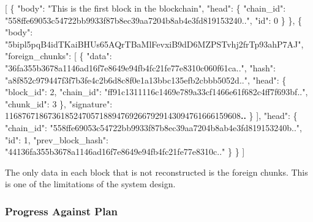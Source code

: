\documentclass[]{article}
\newenvironment{Shaded}{}{}
\newcommand{\DataTypeTok}[1]{\textcolor[rgb]{0.56,0.13,0.00}{#1}}
\newcommand{\DecValTok}[1]{\textcolor[rgb]{0.25,0.63,0.44}{#1}}
\newcommand{\ErrorTok}[1]{\textcolor[rgb]{1.00,0.00,0.00}{\textbf{#1}}}
\newcommand{\FunctionTok}[1]{\textcolor[rgb]{0.02,0.16,0.49}{#1}}
\newcommand{\OtherTok}[1]{\textcolor[rgb]{0.00,0.44,0.13}{#1}}
\newcommand{\StringTok}[1]{\textcolor[rgb]{0.25,0.44,0.63}{#1}}
\begin{document}
\begin{Shaded}
\begin{Highlighting}[]
\OtherTok{[}
    \FunctionTok{\{}
        \DataTypeTok{"body"}\FunctionTok{:} \StringTok{"This is the first block in the blockchain"}\FunctionTok{,}
        \DataTypeTok{"head"}\FunctionTok{:} \FunctionTok{\{}
            \DataTypeTok{"chain_id"}\FunctionTok{:} \StringTok{"558ffe69053c54722bb9933f87b8ec39aa7204b8ab4e3fd819153240.."}\FunctionTok{,}
            \DataTypeTok{"id"}\FunctionTok{:} \DecValTok{0}
        \FunctionTok{\}}
    \FunctionTok{\}}\OtherTok{,}
    \FunctionTok{\{}
        \DataTypeTok{"body"}\FunctionTok{:} \StringTok{"5bipl5pqB4idTKaiBHUs65AQrTBaMlFevxiB9dD6MZPSTvhj2frTp93ahP7AJ"}\FunctionTok{,}
        \DataTypeTok{"foreign_chunks"}\FunctionTok{:} \OtherTok{[}
            \FunctionTok{\{}
                \DataTypeTok{"data"}\FunctionTok{:} \StringTok{"36fa355b3678a1146ad16f7e8649e94fb4fc21fe77e8310c060f61ca.."}\FunctionTok{,}
                \DataTypeTok{"hash"}\FunctionTok{:} \StringTok{"a8f852c979447f3f7b3fe4c2b6d8c8f0e1a13bbc135efb2cbbb5052d.."}\FunctionTok{,}
                \DataTypeTok{"head"}\FunctionTok{:} \FunctionTok{\{}
                    \DataTypeTok{"block_id"}\FunctionTok{:} \DecValTok{2}\FunctionTok{,}
                    \DataTypeTok{"chain_id"}\FunctionTok{:} \StringTok{"ff91c1311116c1469e789a33cf1466e61f682c4ff7f693bf.."}\FunctionTok{,}
                    \DataTypeTok{"chunk_id"}\FunctionTok{:} \DecValTok{3}
                \FunctionTok{\},}
                \DataTypeTok{"signature"}\FunctionTok{:} \DecValTok{1168767186736185247057188947692667929143094761666159608}\ErrorTok{..}
            \FunctionTok{\}}
        \OtherTok{]}\FunctionTok{,}
        \DataTypeTok{"head"}\FunctionTok{:} \FunctionTok{\{}
            \DataTypeTok{"chain_id"}\FunctionTok{:} \StringTok{"558ffe69053c54722bb9933f87b8ec39aa7204b8ab4e3fd819153240b.."}\FunctionTok{,}
            \DataTypeTok{"id"}\FunctionTok{:} \DecValTok{1}\FunctionTok{,}
            \DataTypeTok{"prev_block_hash"}\FunctionTok{:} \StringTok{"44136fa355b3678a1146ad16f7e8649e94fb4fc21fe77e8310c.."}
        \FunctionTok{\}}
    \FunctionTok{\}}
\OtherTok{]}
\end{Highlighting}
\end{Shaded}

The only data in each block that is not reconstructed is the foreign
chunks. This is one of the limitations of the system design.

\hypertarget{header-n116}{%
\subsubsection{Progress Against Plan}\label{header-n116}}
\end{document}
